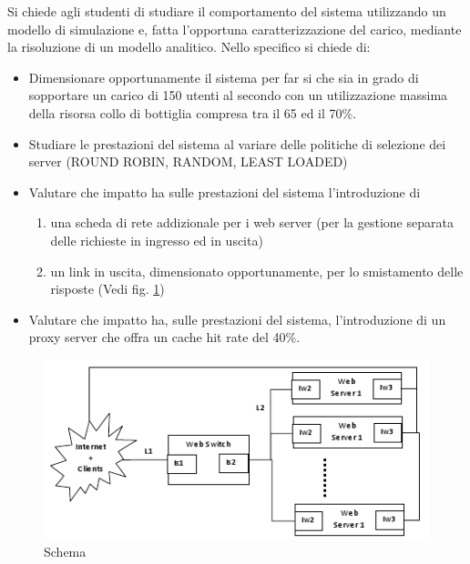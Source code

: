 Si chiede agli studenti di studiare il comportamento del sistema utilizzando un modello di simulazione e, fatta l’opportuna caratterizzazione del carico, mediante la risoluzione di un modello analitico. Nello specifico si chiede di: 
\begin{itemize}
	\item Dimensionare opportunamente il sistema per far si che sia in grado di sopportare un carico di 150 utenti al secondo con un utilizzazione massima della risorsa collo di bottiglia compresa tra il 65 ed il 70\%.
	\item Studiare le prestazioni del sistema al variare delle politiche di selezione dei server (ROUND ROBIN, RANDOM, LEAST LOADED) 
	\item Valutare che impatto ha sulle prestazioni del sistema l’introduzione di 
	\begin{enumerate}
		\item una scheda di rete addizionale per i web server (per la gestione separata delle richieste in ingresso ed in uscita)
		\item un link in uscita, dimensionato opportunamente, per lo smistamento delle risposte (Vedi fig. \ref{schema2}) 
	\end{enumerate}
	\item Valutare che impatto ha, sulle prestazioni del sistema, l’introduzione di un proxy server che offra un cache hit rate del 40\%.
\end{itemize}
\begin{figure}[H]
\begin{center}
\includegraphics[scale=0.5]{etc/schema2.png}
\caption{Schema}
\label{schema2}
\end{center}
\end{figure}
